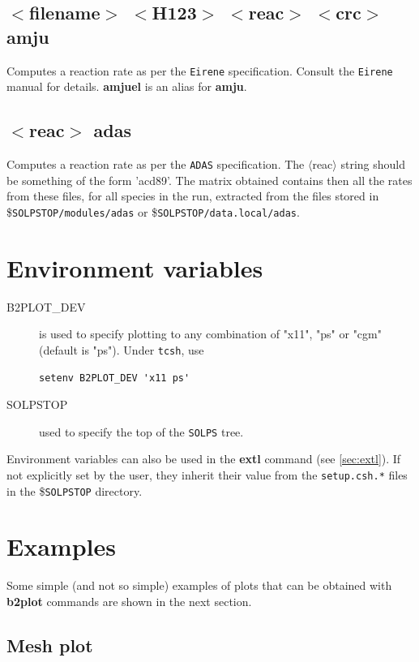 \documentclass[a4paper,10pt]{report}
\newcommand{\btwoplot}{{\bf b2plot} }
\begin{document}
\subsection{$<$filename$>$ $<$H123$>$ $<$reac$>$ $<$crc$>$ amju}\label{sec:amju}
Computes a reaction rate as per the {\tt Eirene} specification. Consult the
{\tt Eirene} manual for details.
{\bf amjuel} is an alias for {\bf amju}.

\subsection{$<$reac$>$ adas}\label{sec:adas}
Computes a reaction rate as per the {\tt ADAS} specification. The $\langle$reac$\rangle$ string should be something of the
form 'acd89'. The matrix obtained contains then all the rates from these files, for all species in the run, extracted
from the files stored in \${\tt SOLPSTOP/modules/adas} or \${\tt SOLPSTOP/data.local/adas}.

\section{Environment variables}

\begin{description}
\item[B2PLOT\_DEV] is used to specify plotting to any combination of
  "x11", "ps" or "cgm" (default is "ps").  Under {\tt tcsh}, use
  \begin{verbatim}
setenv B2PLOT_DEV 'x11 ps'
  \end{verbatim}
\item[SOLPSTOP] used to specify the top of the {\tt SOLPS} tree.
\end{description}

Environment variables can also be used in the {\bf extl} command
(see \ref{sec:extl}). If not explicitly set by the user, they inherit
their value from the {\tt setup.csh.*} files in the \${\tt SOLPSTOP}
directory.

\section{Examples}

Some simple (and not so simple) examples of plots that can be obtained with
\btwoplot commands are shown in the next section.

\subsection{Mesh plot}
\end{document}
